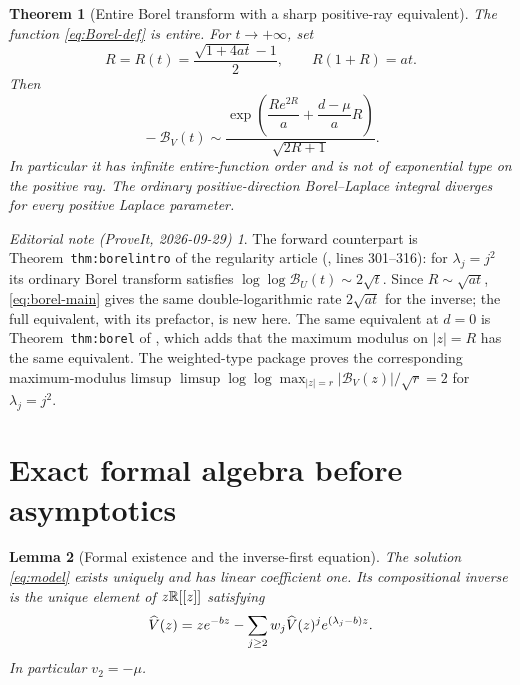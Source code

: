 \documentclass[11pt,a4paper]{article}
\numberwithin{equation}{section}
\newtheorem{theorem}{Theorem}[section]
\newtheorem{lemma}[theorem]{Lemma}
\theoremstyle{definition}
\theoremstyle{remark}
\newtheorem*{ednote}{Editorial note (ProveIt, 2026-09-29)}
\newcommand{\Bcal}{\mathcal B}\newcommand{\Ccal}{\mathcal C}
\newcommand{\abs}[1]{\lvert#1\rvert}
\begin{document}
\begin{theorem}[Entire Borel transform with a sharp positive-ray equivalent]
\label{thm:borel}
The function \eqref{eq:Borel-def} is entire. For $t\to+\infty$, set
\begin{equation}
 R=R(t)=\frac{\sqrt{1+4at}-1}{2},\qquad R(1+R)=at.
 \label{eq:R}
\end{equation}
Then
\begin{equation}
 \boxed{\qquad
 -\Bcal_V(t)\sim
 \frac{\exp\!\left(\dfrac{R e^{2R}}a+
                         \dfrac{d-\mu}{a}R\right)}{\sqrt{2R+1}}.
 \qquad}
 \label{eq:borel-main}
\end{equation}
In particular it has infinite entire-function order and is not of
exponential type on the positive ray. The ordinary positive-direction
Borel--Laplace integral diverges for every positive Laplace parameter.
\end{theorem}

\begin{ednote}
The forward counterpart is Theorem~\texttt{thm:borelintro} of the
regularity article \cite{ed:reg}
(,
lines 301--316): for $\lambda_j=j^2$ its ordinary Borel transform
satisfies $\log\log\Bcal_U(t)\sim2\sqrt t$. Since $R\sim\sqrt{at}$,
\eqref{eq:borel-main} gives the same double-logarithmic rate
$2\sqrt{at}$ for the inverse; the full equivalent, with its prefactor,
is new here. The same equivalent at $d=0$ is
Theorem~\texttt{thm:borel} of \cite{ed:sqf}, which adds that the maximum
modulus on $\abs{z}=R$ has the same equivalent. The weighted-type package
\cite{ed:swt} proves the corresponding maximum-modulus limsup
$\limsup\log\log\max_{\abs{z}=r}\abs{\Bcal_V(z)}/\sqrt r=2$ for
$\lambda_j=j^2$.
\end{ednote}

\section{Exact formal algebra before asymptotics}
\label{sec:formal}

\begin{lemma}[Formal existence and the inverse-first equation]
\label{lem:existence}
The solution \eqref{eq:model} exists uniquely and has linear coefficient
one. Its compositional inverse is the unique element of $z\mathbb R[[z]]$
satisfying
\begin{equation}
 \widehat V(z)=z e^{-bz}-\sum_{j\ge2}w_j\widehat V(z)^j
                                      e^{(\lambda_j-b)z}.
 \label{eq:inverse-normalized}
\end{equation}
In particular $v_2=-\mu$.
\end{lemma}
\end{document}
